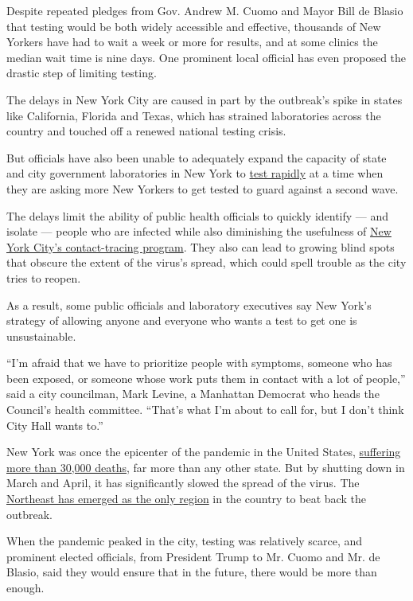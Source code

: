 Despite repeated pledges from Gov. Andrew M. Cuomo and Mayor Bill de
Blasio that testing would be both widely accessible and effective,
thousands of New Yorkers have had to wait a week or more for results,
and at some clinics the median wait time is nine days. One prominent
local official has even proposed the drastic step of limiting testing.

The delays in New York City are caused in part by the outbreak's spike
in states like California, Florida and Texas, which has strained
laboratories across the country and touched off a renewed national
testing crisis.

But officials have also been unable to adequately expand the capacity of
state and city government laboratories in New York to
\href{https://www.nytimes.com/2020/08/06/health/rapid-Covid-tests.html}{test
rapidly} at a time when they are asking more New Yorkers to get tested
to guard against a second wave.

The delays limit the ability of public health officials to quickly
identify --- and isolate --- people who are infected while also
diminishing the usefulness of
\href{https://www.nytimes.com/2020/06/21/nyregion/nyc-contact-tracing.html}{New
York City's contact-tracing program}. They also can lead to growing
blind spots that obscure the extent of the virus's spread, which could
spell trouble as the city tries to reopen.

As a result, some public officials and laboratory executives say New
York's strategy of allowing anyone and everyone who wants a test to get
one is unsustainable.

``I'm afraid that we have to prioritize people with symptoms, someone
who has been exposed, or someone whose work puts them in contact with a
lot of people,'' said a city councilman, Mark Levine, a Manhattan
Democrat who heads the Council's health committee. ``That's what I'm
about to call for, but I don't think City Hall wants to.''

New York was once the epicenter of the pandemic in the United States,
\href{https://www.nytimes.com/interactive/2020/us/new-york-coronavirus-cases.html}{suffering
more than 30,000 deaths}, far more than any other state. But by shutting
down in March and April, it has significantly slowed the spread of the
virus. The
\href{https://www.nytimes.com/2020/07/22/us/coronavirus-northeast-governors.html}{Northeast
has emerged as the only region} in the country to beat back the
outbreak.

When the pandemic peaked in the city, testing was relatively scarce, and
prominent elected officials, from President Trump to Mr. Cuomo and Mr.
de Blasio, said they would ensure that in the future, there would be
more than enough.

